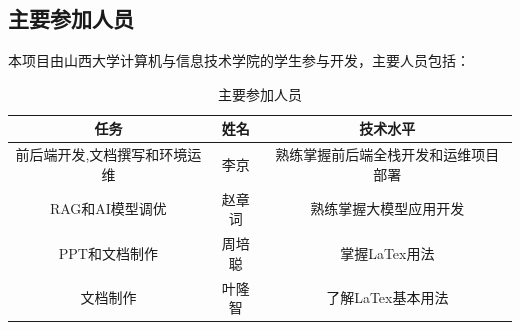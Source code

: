\documentclass[
    report,     %
    oneside,    %
    UTF8,       %
    zihao=-4    %
]{config} %
\begin{document}
\subsection{主要参加人员}
本项目由山西大学计算机与信息技术学院的学生参与开发，主要人员包括：
\begin{table}[H] %
    \centering %
    \caption{主要参加人员} %
    \label{tab:participants} %
    \renewcommand\arraystretch{0.85} %
    \setlength{\tabcolsep}{12pt} %
    \begin{tabular}{ccc}
        \toprule[1.5pt] %
        \textbf{任务} & \textbf{姓名} & \textbf{技术水平} \\ %
        \midrule[0.8pt] %
            前后端开发,文档撰写和环境运维 & 李京 & 熟练掌握前后端全栈开发和运维项目部署 \\ %
            RAG和AI模型调优 & 赵章词 & 熟练掌握大模型应用开发 \\ %
            PPT和文档制作 & 周培聪 & 掌握LaTex用法 \\ %
            文档制作 & 叶隆智 & 了解LaTex基本用法 \\ %
        \hline\hline %
    \end{tabular}
\end{table}
\end{document}
